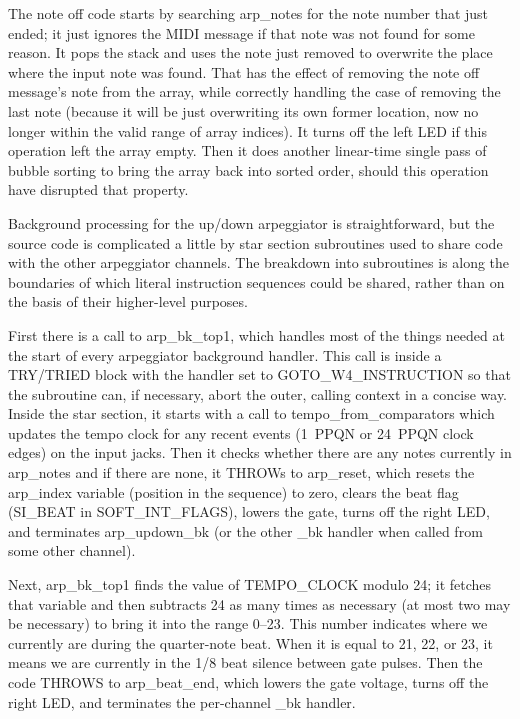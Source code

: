 The note off code starts by searching arp\_notes for the note number that
just ended; it just ignores the MIDI message if that note was not found for
some reason.  It pops the stack and uses the note just removed to overwrite
the place where the input note was found.  That has the effect of removing
the note off message's note from the array, while correctly handling the
case of removing the last note (because it will be just overwriting its own
former location, now no longer within the valid range of array indices).  It
turns off the left LED if this operation left the array empty.  Then it does
another linear-time single pass of bubble sorting to bring the array back
into sorted order, should this operation have disrupted that property.

Background processing for the up/down arpeggiator is straightforward, but
the source code is complicated a little by star section subroutines used to
share code with the other arpeggiator channels.  The breakdown into
subroutines is along the boundaries of which literal instruction sequences
could be shared, rather than on the basis of their higher-level purposes.

First there is a call to arp\_bk\_top1, which handles most of the things
needed at the start of every arpeggiator background handler.  This call is
inside a TRY/TRIED block with the handler set to GOTO\_W4\_INSTRUCTION so
that the subroutine can, if necessary, abort the outer, calling context in a
concise way.  Inside the star section, it starts with a call to
tempo\_from\_comparators which updates the tempo clock for any recent events
(1~PPQN or 24~PPQN clock edges) on the input jacks.  Then it checks whether
there are any notes currently in arp\_notes and if there are none, it THROWs
to arp\_reset, which resets the arp\_index variable (position in the
sequence) to zero, clears the beat flag (SI\_BEAT in SOFT\_INT\_FLAGS),
lowers the gate, turns off the right LED, and terminates arp\_updown\_bk (or
the other \_bk handler when called from some other channel).

Next, arp\_bk\_top1 finds the value of TEMPO\_CLOCK modulo 24; it fetches
that variable and then subtracts 24 as many times as necessary (at most two
may be necessary) to bring it into the range 0--23.  This number indicates
where we currently are during the quarter-note beat.  When it is equal to
21, 22, or 23, it means we are currently in the 1/8 beat silence between
gate pulses.  Then the code THROWS to arp\_beat\_end, which lowers the gate
voltage, turns off the right LED, and terminates the per-channel \_bk
handler.

